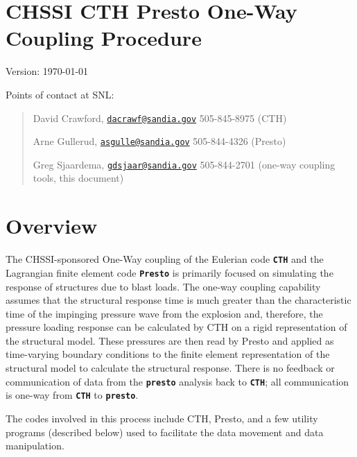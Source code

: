\documentclass[11pt,twoside]{article}
\newcommand{\code}[1]
   {\mbox{\bf\tt #1}\null}
\begin{document}
\clearpage\pagestyle{Standard}
\section[CHSSI CTH Presto One{}-Way Coupling Procedure]{CHSSI CTH Presto
One{}-Way Coupling Procedure}
{Version: \centering \today}

Points of contact at SNL:
\begin{quote}
David Crawford,
\href{mailto:dacrawf@sandia.gov}{\nolinkurl{dacrawf@sandia.gov}}
505{}-845{}-8975  (CTH)

Arne Gullerud,
\href{mailto:asgulle@sandia.gov}{\nolinkurl{asgulle@sandia.gov}}
505{}-844{}-4326  (Presto)

Greg Sjaardema,
\href{mailto:gdsjaar@sandia.gov}{\nolinkurl{gdsjaar@sandia.gov}}
505{}-844{}-2701 (one{}-way coupling tools, this document)
\end{quote}

\section{Overview}
The CHSSI-sponsored One{}-Way coupling of the Eulerian code \code{CTH}
and the Lagrangian finite element code \code{Presto} is primarily
focused on simulating the response of structures due to blast loads.
The one-way coupling capability assumes that the structural response
time is much greater than the characteristic time of the impinging
pressure wave from the explosion and, therefore, the pressure loading
response can be calculated by CTH on a rigid representation of the
structural model.  These pressures are then read by Presto and applied
as time-varying boundary conditions to the finite element
representation of the structural model to calculate the structural
response.  There is no feedback or communication of data from the
\code{presto} analysis back to \code{CTH}; all communication is
one{}-way from \code{CTH} to \code{presto}. 

The codes involved in this process include CTH, Presto, and a few
utility programs (described below) used to facilitate the data
movement and data manipulation.
\end{document}
